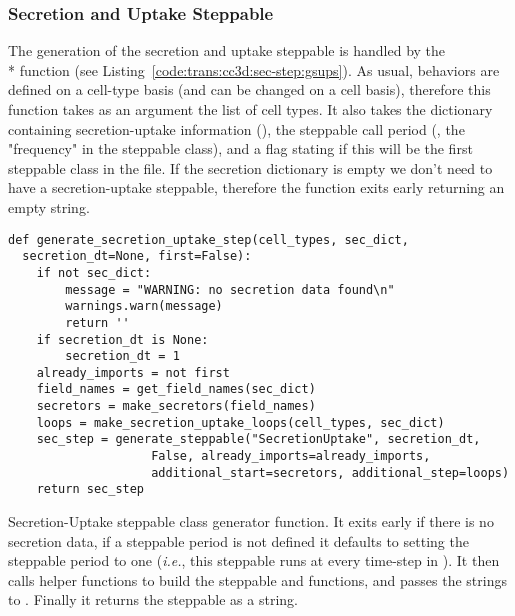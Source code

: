\subsubsection{Secretion and Uptake Steppable}\label{sec:trans:gen:step:sec}
The generation of the secretion and uptake steppable is handled by the \\* function (see Listing~\ref{code:trans:cc3d:sec-step:gsups}). As usual, behaviors are defined on a cell-type basis (and can be changed on a cell basis), therefore this function takes as an argument the list of cell types. It also takes the dictionary containing secretion-uptake information (), the steppable call period (, the "frequency" in the steppable class), and a flag stating if this will be the first steppable class in the file. If the secretion dictionary is empty we don't need to have a secretion-uptake steppable, therefore the function exits early returning an empty string. 
\begin{listing}[H]%
\begin{verbatim}
def generate_secretion_uptake_step(cell_types, sec_dict, 
  secretion_dt=None, first=False):
    if not sec_dict:
        message = "WARNING: no secretion data found\n"
        warnings.warn(message)
        return ''
    if secretion_dt is None:
        secretion_dt = 1
    already_imports = not first
    field_names = get_field_names(sec_dict)
    secretors = make_secretors(field_names)
    loops = make_secretion_uptake_loops(cell_types, sec_dict)
    sec_step = generate_steppable("SecretionUptake", secretion_dt, 
                    False, already_imports=already_imports, 
                    additional_start=secretors, additional_step=loops)
    return sec_step
\end{verbatim}
\caption{Secretion-Uptake steppable class generator function. It exits early if there is no secretion data, if a steppable period is not defined it defaults to setting the steppable period to one (\textit{i.e.}, this steppable runs at every time-step in \ccd). It then calls helper functions to build the steppable  and  functions, and passes the strings to . Finally it returns the steppable as a string.}\label{code:trans:cc3d:sec-step:gsups}
\end{listing}

